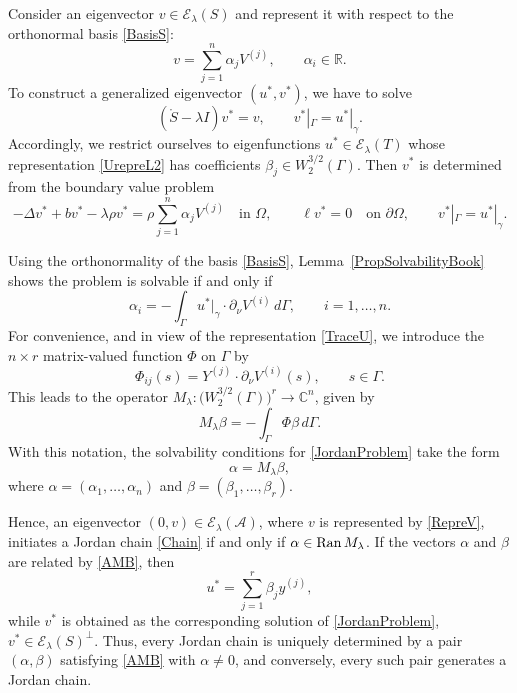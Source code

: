 \documentclass[reqno]{amsart}
\theoremstyle{definition}
\theoremstyle{remark}
\numberwithin{equation}{section}
\newcommand{\Ran}{\mathop{\rm Ran}}
\newcommand{\Real}{\mathbb R}
\newcommand{\Comp}{\mathbb C}
\newcommand{\cA}{\mathcal{A}}
\newcommand{\cE}{\mathcal{E}}
\begin{document}
Consider an eigenvector $v\in\cE_\lambda(S)$ and represent it with respect to the orthonormal basis \eqref{BasisS}:
\begin{equation}\label{RepreV}
v=\sum_{j=1}^{n}\alpha_jV^{(j)}, \qquad \alpha_i\in\Real.
\end{equation}
To construct a generalized eigenvector $(u^*,v^*)$, we have to solve
\begin{equation*}
 (\mathring S-\lambda I)v^*=v,\qquad   v^*|_\Gamma=u^*|_\gamma.
\end{equation*}
Accordingly, we restrict ourselves to eigenfunctions $u^*\in\cE_\lambda(T)$ whose representation \eqref{UrepreL2} has
coefficients $\beta_j\in W_2^{3/2}(\Gamma)$.
Then $v^*$ is determined from the boundary value problem
\begin{equation}\label{JordanProblem}
-\Delta v^*+bv^*-\lambda\rho v^*=
\rho\sum_{j=1}^{n}\alpha_jV^{(j)}
\quad\text{in }\Omega,\qquad
\ell v^*=0\quad\text{on }\partial\Omega,\qquad
v^*|_\Gamma=u^*|_\gamma.
\end{equation}


Using the orthonormality of the basis \eqref{BasisS}, Lemma~\ref{PropSolvabilityBook} shows the problem is solvable if and only if
\begin{equation*}
\alpha_i=-\int_\Gamma u^*|_\gamma\cdot\partial_\nu V^{(i)}\,d\Gamma, \qquad i=1,\dots,n.
\end{equation*}
For convenience, and in view of the representation \eqref{TraceU}, we introduce the $n\times r$ matrix-valued function $\Phi$ on $\Gamma$ by
\begin{equation*}
\Phi_{ij}(s)=Y^{(j)}\cdot\partial_\nu V^{(i)}(s),
\qquad s\in\Gamma.
\end{equation*}
This leads to the operator $M_\lambda\colon\bigl(W_2^{3/2}(\Gamma)\bigr)^r\to\Comp^n$,
given by
\begin{equation}\label{OperatorM}
M_\lambda\beta=-\int_\Gamma\Phi\beta\,d\Gamma.
\end{equation}
With this notation, the solvability conditions for \eqref{JordanProblem} take the form
\begin{equation}\label{AMB}
\alpha=M_\lambda\beta,
\end{equation}
where $\alpha=(\alpha_1,\dots,\alpha_n)$ and $\beta=(\beta_1,\dots,\beta_r)$. 

Hence, an eigenvector $(0,v)\in\cE_\lambda(\cA)$, where $v$ is represented by \eqref{RepreV}, initiates a Jordan chain \eqref{Chain}  if and only if $\alpha\in\Ran M_\lambda$. If the vectors $\alpha$ and $\beta$ are related by \eqref{AMB}, then
\begin{equation*}
u^*=\sum_{j=1}^{r}\beta_jy^{(j)},
\end{equation*}
while $v^*$ is obtained as the corresponding solution of \eqref{JordanProblem}, $v^*\in\cE_\lambda(S)^\perp$. Thus, every Jordan chain is uniquely determined by a pair
$(\alpha,\beta)$ satisfying \eqref{AMB} with $\alpha\neq0$, and conversely, every such pair generates a Jordan chain.
\end{document}

